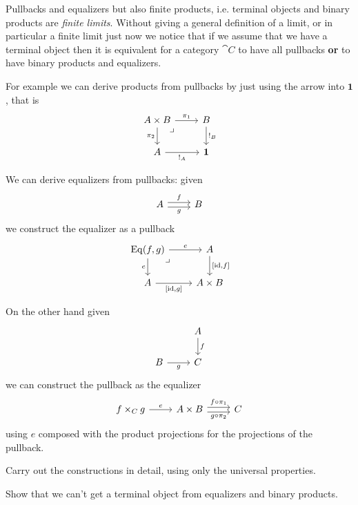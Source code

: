 Pullbacks and equalizers but also finite products, i.e. terminal objects and binary products are \emph{finite limits}. Without giving a general definition of a limit, or in particular a finite limit just now we notice that if we assume that we have a terminal object then it is equivalent for a category $\cat{C}$ to have all pullbacks \textbf{or} to have binary products and equalizers.

For example we can derive products from pullbacks by just using the arrow into  $\mathbf{1}$, that is 
\[\begin{tikzcd}
A \times B \arrow[r,"\pi_1"] \arrow[d,"\pi_2" left] \arrow[dr, phantom, "\lrcorner", very near start]
    & B \arrow[d,"!_B"] \\
A \arrow[r,"!_A" below] & \bf{1}
\end{tikzcd}\]

We can derive equalizers from pullbacks: given 
\[\begin{tikzcd}
  A \arrow[r,"f",shift left] \arrow[r,"g" below,shift right]& B 
\end{tikzcd}\]
we construct the equalizer as a pullback
\[\begin{tikzcd}
\Eq{f}{g}\arrow[r,"e"] \arrow[d,"e" left] \arrow[dr, phantom, "\lrcorner", very near start]
    & A \arrow[d,"\pair{\id}{f}"] \\
A \arrow[r,"\pair{\id}{g}" below] & A \times B
\end{tikzcd}\]

On the other hand given 
\[\begin{tikzcd}
& A \arrow[d,"f"] \\
B \arrow[r,"g" below] &C 
\end{tikzcd}\]
we can construct the pullback as the equalizer
\[\begin{tikzcd}
  f\times_C g \arrow[r,"e"] & A\times B \arrow[r,"f \circ \pi_1",shift left] \arrow[r,"g \circ \pi_2" below,shift right]& C
\end{tikzcd}\]
using $e$ composed with the product projections for the projections of the pullback.

\begin{Exercise}
  Carry out the constructions in detail, using only the universal properties.
\end{Exercise}

\begin{Exercise}
  Show that we can't get a terminal object from equalizers and binary products.
\end{Exercise}

